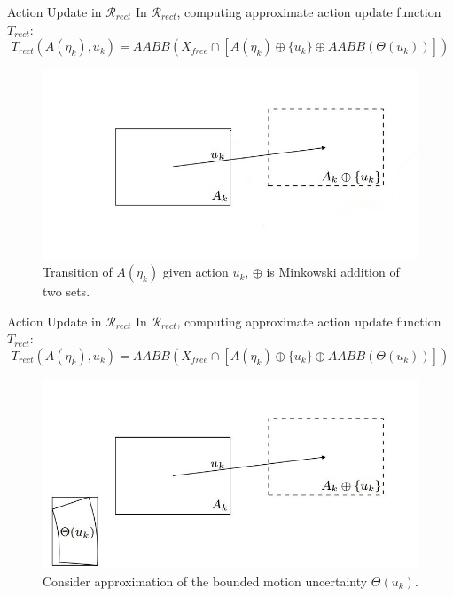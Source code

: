 \begin{frame} {Action Update in $\mathcal{R}_{rect}$}
  In $\mathcal{R}_{rect}$, computing approximate action update function $T_{rect} :$\\
  $$T_{rect}(A(\eta_k), u_k) = AABB(X_{free} \cap [A(\eta_k) \oplus \{ u_k \} \oplus AABB(\Theta(u_k))])$$
  \begin{figure}
    \includegraphics[scale=0.35]{figs/t_rect.jpg}
    \caption{Transition of $A(\eta_k)$ given action $u_k$, $\oplus$ is Minkowski addition of two sets.}
  \end{figure}
\end{frame}

\begin{frame}{Action Update in $\mathcal{R}_{rect}$}
  In $\mathcal{R}_{rect}$, computing approximate action update function $T_{rect} :$\\
  $$T_{rect}(A(\eta_k), u_k) = AABB(X_{free} \cap [A(\eta_k) \oplus \{ u_k \} \oplus AABB(\Theta(u_k))])$$
  \begin{figure}
    \includegraphics[scale=0.35]{figs/t_rect2.jpg}
    \caption{Consider approximation of the bounded motion uncertainty $\Theta(u_k)$.}
  \end{figure}
\end{frame}

